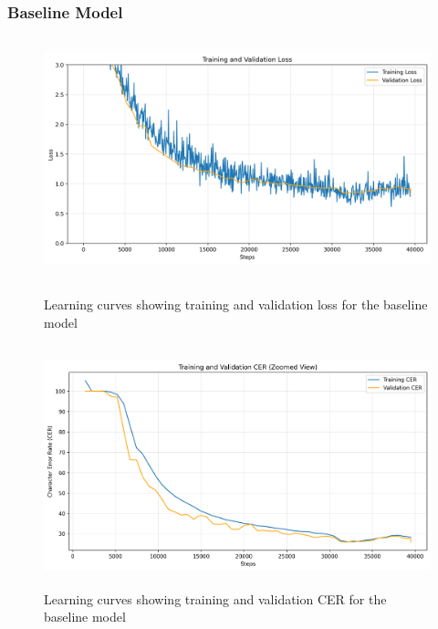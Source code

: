 \subsubsection{Baseline Model}
\begin{figure}[H]
    \centering
    \begin{minipage}{0.48\textwidth}
        \centering
        \includegraphics[height=7cm,width=\textwidth]{../results/model-tiny-new/loss_plot.png}
        \caption{Learning curves showing training and validation loss for the baseline model}
        \label{fig:baseline_loss}
    \end{minipage}
    \hfill
    \begin{minipage}{0.48\textwidth}
        \centering
        \includegraphics[height=7cm, width=\textwidth]{../results/model-tiny-new/cer_zoomed_plot.png}
        \caption{Learning curves showing training and validation CER for the baseline model}
        \label{fig:baseline_cer}
    \end{minipage}
\end{figure}

